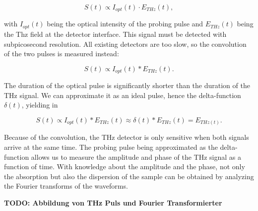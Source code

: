 \begin{equation}
	S(t) \propto I_{opt}(t)\cdot E_{THz}(t),
\end{equation}

with $I_{opt}(t)$ being the optical intensity of the probing pulse and $E_{THz}(t)$ being the Thz field at the detector interface. This signal must be detected with subpicosecond resolution. All existing detectors are too slow, so the convolution of the two pulses is measured instead: 

\begin{equation}
	S(t) \propto I_{opt}(t) \ast E_{THz}(t).
\end{equation}

The duration of the optical pulse is significantly shorter than the duration of the THz signal. We can approximate it as an ideal pulse, hence the delta-function $\delta(t)$, yielding in

\begin{equation}
	S(t) \propto I_{opt}(t) \ast E_{THz}(t) \approx \delta(t) \ast E_{THz}(t) = E_{THz(t)}.
\end{equation}

Because of the convolution, the THz detector is only sensitive when both signals arrive at the same time. The probing pulse being approximated as the delta-function allows us to measure the amplitude and phase of the THz signal as a function of time. With knowledge about the amplitude and the phase, not only the absorption but also the dispersion of the sample can be obtained by analyzing the Fourier transforms of the waveforms. 


\textbf{TODO: Abbildung von THz Puls und Fourier Transformierter}